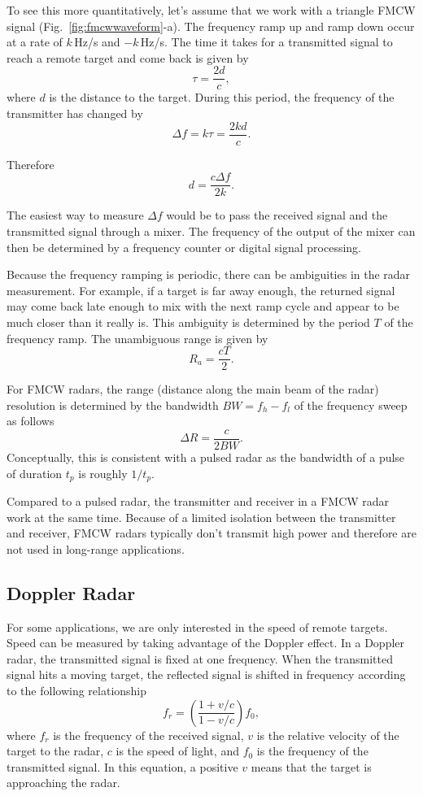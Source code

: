 \documentclass[letterpaper, 11pt]{article}
\begin{document}
To see this more quantitatively, let's assume that we work with a triangle FMCW signal (Fig.~\ref{fig:fmcwwaveform}-a). The frequency ramp up and ramp down occur at a rate of $k$\,Hz/s and $-k$\,Hz/s. The time it takes for a transmitted signal to reach a remote target and come back is given by 
\[
\tau = \frac{2d}{c},
\]
where $d$ is the distance to the target. During this period, the frequency of the transmitter has changed by 
\[ 
\Delta f = k\tau = \frac{2kd}{c}.
\] 

Therefore
\[
d = \frac{c\Delta f}{2k}.
\]

The easiest way to measure $\Delta f$ would be to pass the received signal and the transmitted signal through a mixer. The frequency of the output of the mixer can then be determined by a frequency counter or digital signal processing. 

Because the frequency ramping is periodic, there can be ambiguities in the radar measurement. For example, if a target is far away enough, the returned signal may come back late enough to mix with the next ramp cycle and appear to be much closer than it really is. This ambiguity is determined by the period $T$ of the frequency ramp. The unambiguous range is given by 
\[
R_a = \frac{cT}{2}. 
\]

For FMCW radars, the range (distance along the main beam of the radar) resolution is determined by the bandwidth $BW = f_h - f_l$ of the frequency sweep as follows
\[
\Delta R = \frac{c}{2BW}. 
\]
Conceptually, this is consistent with a pulsed radar as the bandwidth of a pulse of duration $t_p$ is roughly $1/t_p$. 

Compared to a pulsed radar, the transmitter and receiver in a FMCW radar work at the same time. Because of a limited isolation between the transmitter and receiver, FMCW radars typically don't transmit high power and therefore are not used in long-range applications.

\subsection{Doppler Radar}

For some applications, we are only interested in the speed of remote targets. Speed can be measured by taking advantage of the Doppler effect. In a Doppler radar, the transmitted signal is fixed at one frequency. When the transmitted signal hits a moving target, the reflected signal is shifted in frequency according to the following relationship 
\[
f_r = \left( \frac{\displaystyle 1+v/c}{\displaystyle 1-v/c}  \right) f_0,
\] 
where $f_r$ is the frequency of the received signal, $v$ is the relative velocity of the target to the radar, $c$ is the speed of light, and $f_0$ is the frequency of the transmitted signal. In this equation, a positive $v$ means that the target is approaching the radar. 
\end{document}
